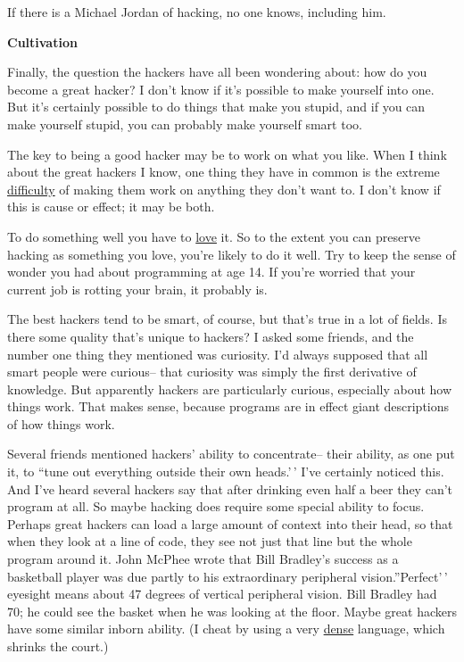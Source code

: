 If there is a Michael Jordan of hacking, no one knows, including him.

\textbf{Cultivation}

Finally, the question the hackers have all been wondering about: how do
you become a great hacker? I don't know if it's possible to make
yourself into one. But it's certainly possible to do things that make
you stupid, and if you can make yourself stupid, you can probably make
yourself smart too.

The key to being a good hacker may be to work on what you like. When I
think about the great hackers I know, one thing they have in common is
the extreme \href{procrastination.html}{difficulty} of making them work
on anything they don't want to. I don't know if this is cause or effect;
it may be both.

To do something well you have to \href{love.html}{love} it. So to the
extent you can preserve hacking as something you love, you're likely to
do it well. Try to keep the sense of wonder you had about programming at
age 14. If you're worried that your current job is rotting your brain,
it probably is.

The best hackers tend to be smart, of course, but that's true in a lot
of fields. Is there some quality that's unique to hackers? I asked some
friends, and the number one thing they mentioned was curiosity. I'd
always supposed that all smart people were curious-- that curiosity was
simply the first derivative of knowledge. But apparently hackers are
particularly curious, especially about how things work. That makes
sense, because programs are in effect giant descriptions of how things
work.

Several friends mentioned hackers' ability to concentrate-- their
ability, as one put it, to ``tune out everything outside their own
heads.'\,' I've certainly noticed this. And I've heard several hackers
say that after drinking even half a beer they can't program at all. So
maybe hacking does require some special ability to focus. Perhaps great
hackers can load a large amount of context into their head, so that when
they look at a line of code, they see not just that line but the whole
program around it. John McPhee wrote that Bill Bradley's success as a
basketball player was due partly to his extraordinary peripheral
vision.''Perfect'\,' eyesight means about 47 degrees of vertical
peripheral vision. Bill Bradley had 70; he could see the basket when he
was looking at the floor. Maybe great hackers have some similar inborn
ability. (I cheat by using a very \href{power.html}{dense} language,
which shrinks the court.)

